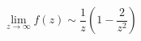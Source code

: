 \begin{equation}
\label{rev11}
\lim_{z \rightarrow \infty} f(z) \sim \frac{1}{z}
\left( 1 - \frac{2}{z^2} \right)
\end{equation}

